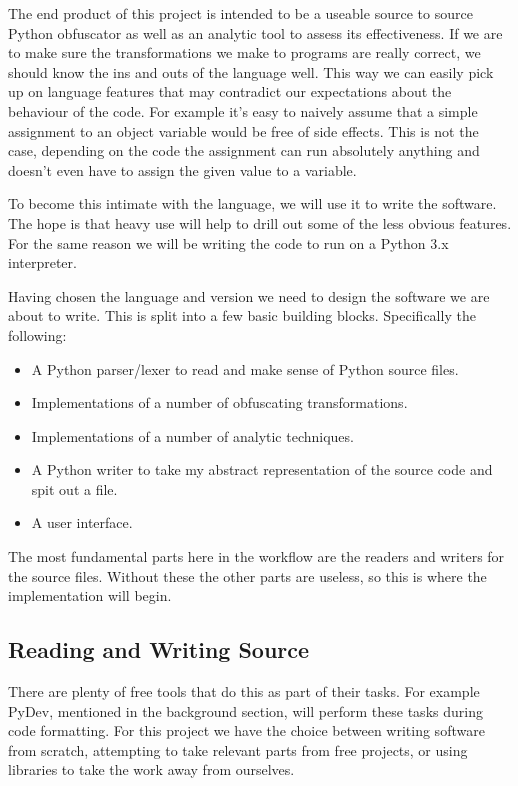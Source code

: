 \documentclass{report}
\begin{document}
The end product of this project is intended to be a useable source to source Python obfuscator as well as an analytic tool
to assess its effectiveness. If we are to make sure the transformations we make to programs are really correct, we should
know the ins and outs of the language well. This way we can easily pick up on language features that may contradict our
expectations about the behaviour of the code. For example it's easy to naively assume that a simple assignment to an object
variable would be free of side effects. This is not the case, depending on the code the assignment can run absolutely
anything \cite{pyprop} and doesn't even have to assign the given value to a variable.

To become this intimate with the language, we will use it to write the software. The hope is that heavy use will help to
drill out some of the less obvious features. For the same reason we will be writing the code to run on a Python 3.x
interpreter.

Having chosen the language and version we need to design the software we are about to write. This is split into a few basic building
blocks. Specifically the following:

\begin{itemize}
\item A Python parser/lexer to read and make sense of Python source files.
\item Implementations of a number of obfuscating transformations.
\item Implementations of a number of analytic techniques.
\item A Python writer to take my abstract representation of the source code and spit out a file.
\item A user interface.
\end{itemize}

The most fundamental parts here in the workflow are the readers and writers for the source files.
Without these the other parts are useless, so this is where the implementation will begin.

\subsection{Reading and Writing Source}

There are plenty of free tools that do this as part of their tasks. For example PyDev, mentioned in the background section, will
perform these tasks during code formatting. For this project we have the choice between writing software from scratch, attempting
to take relevant parts from free projects, or using libraries to take the work away from ourselves.
\end{document}
